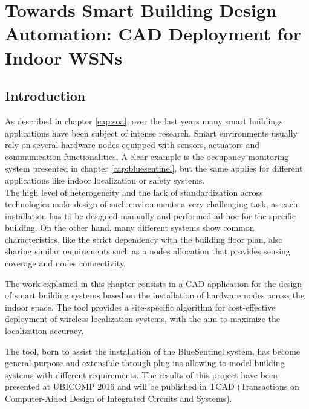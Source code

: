%

\chapter[CAD Deployment for Indoor WSNs]{Towards Smart Building Design Automation: CAD Deployment for Indoor WSNs}
\label{cap:cad}


\section{Introduction}
\label{sec:CADintro}
As described in chapter \ref{cap:soa}, over the last years many smart buildings applications have been subject of intense research.
Smart environments usually rely on several hardware nodes equipped with sensors, actuators and communication functionalities.
A clear example is the occupancy monitoring system presented in chapter \ref{cap:bluesentinel}, but the same applies for different applications like indoor localization or safety systems.\\
The high level of heterogeneity and the lack of standardization across technologies make design of such environments a very challenging task, as each installation has to be designed manually and performed ad-hoc for the specific building.
On the other hand, many different systems show common characteristics, like the strict dependency with the building floor plan, also sharing similar requirements such as a nodes allocation that provides sensing coverage and nodes connectivity.

The work explained in this chapter consists in a CAD application for the design of smart building systems based on the installation of hardware nodes across the indoor space. The tool provides a site-specific algorithm for cost-effective deployment of wireless localization systems, with the aim to maximize the localization accuracy.

The tool, born to assist the installation of the BlueSentinel system, has become general-purpose and extensible through plug-ins allowing to model building systems with different requirements.
The results of this project have been presented at UBICOMP 2016 \cite{Cirigliano2016} and will be published in TCAD (Transactions on Computer-Aided Design of Integrated Circuits and Systems).

